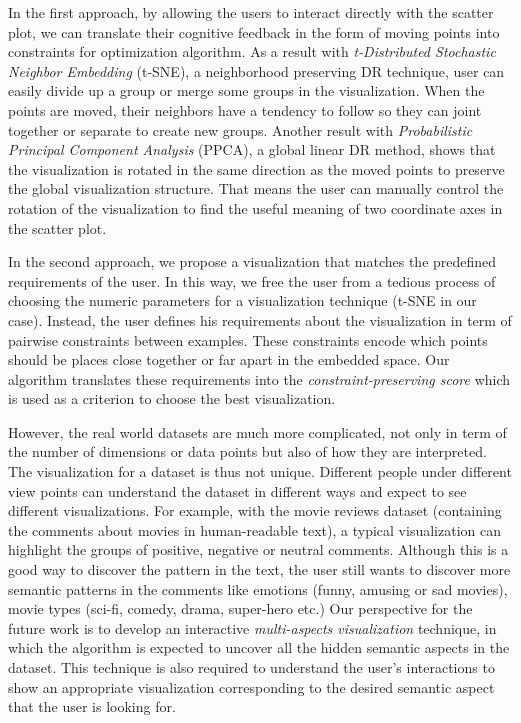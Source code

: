 In the first approach, by allowing the users to interact directly with the scatter plot, we can translate their cognitive feedback in the form of moving points into constraints for optimization algorithm.
As a result with \emph{t-Distributed Stochastic Neighbor Embedding} (t-SNE), a neighborhood preserving DR technique, user can easily divide up a group or merge some groups in the visualization.
When the points are moved, their neighbors have a tendency to follow so they can joint together or separate to create new groups.
Another result with \emph{Probabilistic Principal Component Analysis} (PPCA), a global linear DR method, shows that the visualization is rotated in the same direction as the moved points to preserve the global visualization structure. That means the user can manually control the rotation of the visualization to find the useful meaning of two coordinate axes in the scatter plot.

In the second approach, we propose a visualization that matches the predefined requirements of the user.
In this way, we free the user from a tedious process of choosing the numeric parameters for a visualization technique (t-SNE in our case).
Instead, the user defines his requirements about the visualization in term of pairwise constraints between examples.
These constraints encode which points should be places close together or far apart in the embedded space.
Our algorithm translates these requirements into the \emph{constraint-preserving score} which is used as a criterion to choose the best visualization.

However, the real world datasets are much more complicated, not only in term of the number of dimensions or data points but also of how they are interpreted.
The visualization for a dataset is thus not unique. Different people under different view points can understand the dataset in different ways and expect to see different visualizations.
For example, with the movie reviews dataset (containing the comments about movies in human-readable text), a typical visualization can highlight the groups of positive, negative or neutral comments.
Although this is a good way to discover the pattern in the text, the user still wants to discover more semantic patterns in the comments like emotions (funny, amusing or sad movies), movie types (sci-fi, comedy, drama, super-hero etc.)
Our perspective for the future work is to develop an interactive \emph{multi-aspects visualization} technique, in which the algorithm is expected to uncover all the hidden semantic aspects in the dataset.
This technique is also required to understand the user's interactions to show an appropriate visualization corresponding to the desired semantic aspect that the user is looking for.